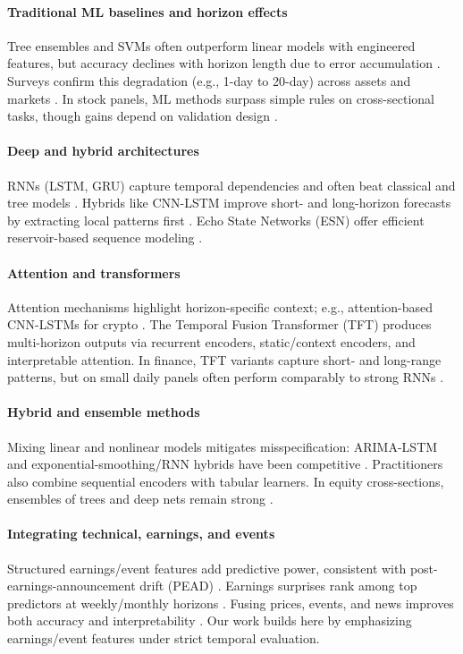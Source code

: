 \documentclass[conference,a4paper]{IEEEtran}
\begin{document}
\paragraph{Traditional ML baselines and horizon effects} Tree ensembles and SVMs often outperform linear models with engineered features, but accuracy declines with horizon length due to error accumulation \citep{gu2018,chen2016xgboost}. Surveys confirm this degradation (e.g., 1-day to 20-day) across assets and markets \citep{zhang2023review}. In stock panels, ML methods surpass simple rules on cross-sectional tasks, though gains depend on validation design \citep{gu2018}.

\paragraph{Deep and hybrid architectures} RNNs (LSTM, GRU) capture temporal dependencies and often beat classical and tree models \citep{hochreiter1997long,cho2014learning,fischer2018,selvin2017}. Hybrids like CNN-LSTM improve short- and long-horizon forecasts by extracting local patterns first \citep{selvin2017}. Echo State Networks (ESN) offer efficient reservoir-based sequence modeling \citep{jaeger2001esn}.

\paragraph{Attention and transformers} Attention mechanisms highlight horizon-specific context; e.g., attention-based CNN-LSTMs for crypto \citep{xu2022bitcoin}. The Temporal Fusion Transformer (TFT) \citep{lim2021temporal} produces multi-horizon outputs via recurrent encoders, static/context encoders, and interpretable attention. In finance, TFT variants capture short- and long-range patterns, but on small daily panels often perform comparably to strong RNNs \citep{zhang2023review}.

\paragraph{Hybrid and ensemble methods} Mixing linear and nonlinear models mitigates misspecification: ARIMA-LSTM and exponential-smoothing/RNN hybrids have been competitive \citep{smyl2020}. Practitioners also combine sequential encoders with tabular learners. In equity cross-sections, ensembles of trees and deep nets remain strong \citep{krauss2017}.

\paragraph{Integrating technical, earnings, and events} Structured earnings/event features add predictive power, consistent with post-earnings-announcement drift (PEAD) \citep{bernard1989}. Earnings surprises rank among top predictors at weekly/monthly horizons \citep{schnaubelt2020}. Fusing prices, events, and news improves both accuracy and interpretability \citep{cheng2022}. Our work builds here by emphasizing earnings/event features under strict temporal evaluation.
\end{document}
